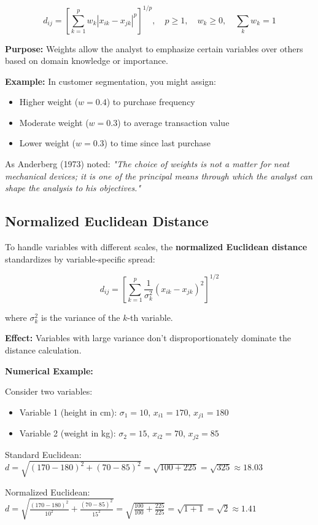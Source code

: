 \documentclass[11pt]{article}
\begin{document}
$$d_{ij} = \left[\sum_{k=1}^{p} w_k |x_{ik} - x_{jk}|^p\right]^{1/p}, \quad p \geq 1, \quad w_k \geq 0, \quad \sum_{k} w_k = 1$$

\textbf{Purpose:} Weights allow the analyst to emphasize certain variables over others based on domain knowledge or importance.

\textbf{Example:} In customer segmentation, you might assign:
\begin{itemize}
    \item Higher weight ($w = 0.4$) to purchase frequency
    \item Moderate weight ($w = 0.3$) to average transaction value
    \item Lower weight ($w = 0.3$) to time since last purchase
\end{itemize}

As Anderberg (1973) noted: \textit{"The choice of weights is not a matter for neat mechanical devices; it is one of the principal means through which the analyst can shape the analysis to his objectives."}

\subsection{Normalized Euclidean Distance}

To handle variables with different scales, the \textbf{normalized Euclidean distance} standardizes by variable-specific spread:

$$d_{ij} = \left[\sum_{k=1}^{p} \frac{1}{\sigma_k^2} (x_{ik} - x_{jk})^2\right]^{1/2}$$

where $\sigma_k^2$ is the variance of the $k$-th variable.

\textbf{Effect:} Variables with large variance don't disproportionately dominate the distance calculation.

\textbf{Numerical Example:}

Consider two variables:
\begin{itemize}
    \item Variable 1 (height in cm): $\sigma_1 = 10$, $x_{i1} = 170$, $x_{j1} = 180$
    \item Variable 2 (weight in kg): $\sigma_2 = 15$, $x_{i2} = 70$, $x_{j2} = 85$
\end{itemize}

Standard Euclidean: $d = \sqrt{(170-180)^2 + (70-85)^2} = \sqrt{100 + 225} = \sqrt{325} \approx 18.03$

Normalized Euclidean: $d = \sqrt{\frac{(170-180)^2}{10^2} + \frac{(70-85)^2}{15^2}} = \sqrt{\frac{100}{100} + \frac{225}{225}} = \sqrt{1 + 1} = \sqrt{2} \approx 1.41$
\end{document}
